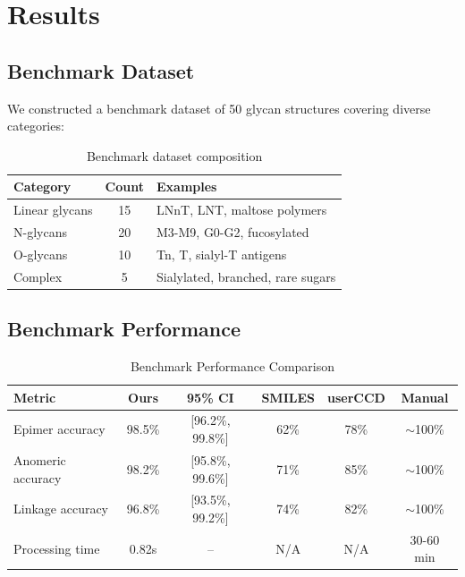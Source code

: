 
\section{Results}

\subsection{Benchmark Dataset}

We constructed a benchmark dataset of 50 glycan structures covering diverse categories:

\begin{table}[h]
\centering
\begin{tabular}{lcl}
\toprule
Category & Count & Examples \\
\midrule
Linear glycans & 15 & LNnT, LNT, maltose polymers \\
N-glycans & 20 & M3-M9, G0-G2, fucosylated \\
O-glycans & 10 & Tn, T, sialyl-T antigens \\
Complex & 5 & Sialylated, branched, rare sugars \\
\bottomrule
\end{tabular}
\caption{Benchmark dataset composition}
\label{tab:benchmark}
\end{table}

\subsection{Benchmark Performance}

\begin{table}[h]
\centering
\caption{Benchmark Performance Comparison}
\begin{tabular}{lccccc}
\toprule
Metric & Ours & 95\% CI & SMILES & userCCD & Manual \\
\midrule
Epimer accuracy & 98.5\% & [96.2\%, 99.8\%] & 62\% & 78\% & $\sim$100\% \\
Anomeric accuracy & 98.2\% & [95.8\%, 99.6\%] & 71\% & 85\% & $\sim$100\% \\
Linkage accuracy & 96.8\% & [93.5\%, 99.2\%] & 74\% & 82\% & $\sim$100\% \\
Processing time & 0.82s & -- & N/A & N/A & 30-60 min \\
\bottomrule
\end{tabular}
\label{tab:benchmark_results}
\end{table}

